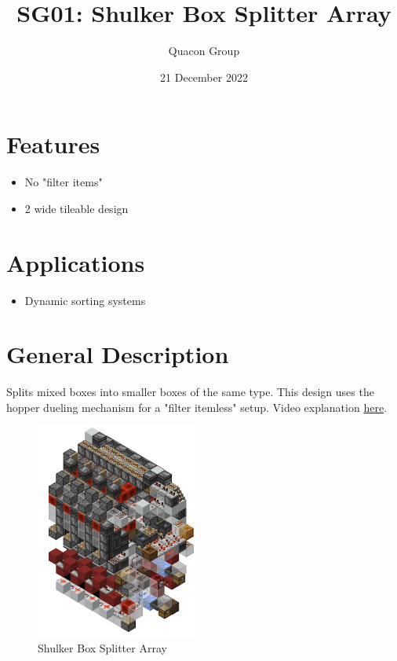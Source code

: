\documentclass[10pt]{datasheet}
\title{SG01: Shulker Box Splitter Array}
\author{Quacon Group}
\date{21 December 2022}
\begin{document}
\maketitle

\section{Features}

\begin{itemize}
\item{No "filter items"}
\item{2 wide tileable design}
\end{itemize}

\section{Applications}

\begin{itemize}
\item{Dynamic sorting systems}
\end{itemize}

\section{General Description}
Splits mixed boxes into smaller boxes of the same type. This design uses the hopper dueling mechanism for a "filter itemless" setup. Video explanation \href{https://www.youtube.com/watch?v=zRO1QfmYa6o}{here}.
\vfill\break

\begin{figure}[h]
    \centering
    \includegraphics[width=0.48\textwidth]{splitarray.png}
    \caption{\centering Shulker Box Splitter Array}
\end{figure}
\end{document}
